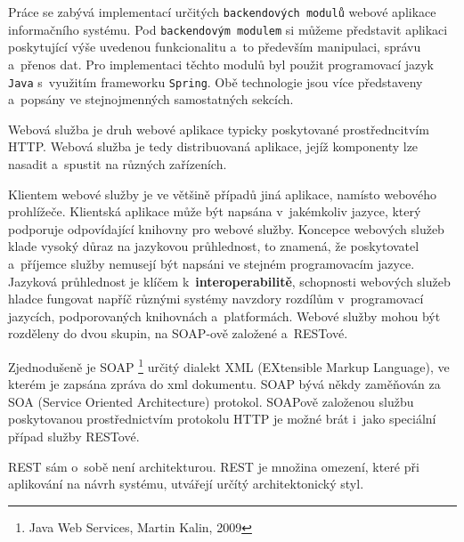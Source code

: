 \documentclass[12pt]{article}
\begin{document}
Práce se zabývá implementací určitých \texttt{backendových modulů} webové aplikace informačního systému. Pod \texttt{backendovým modulem} si můžeme představit aplikaci
poskytující výše uvedenou funkcionalitu a~to především manipulaci, správu a~přenos dat.
Pro implementaci těchto modulů byl použit programovací jazyk \texttt{Java} s~využitím frameworku \texttt{Spring}. Obě technologie jsou více představeny a~popsány ve stejnojmenných samostatných sekcích.




Webová služba
je druh webové aplikace typicky poskytované prostředncitvím HTTP. 
Webová služba je tedy distribuovaná aplikace, jejíž komponenty lze nasadit a~spustit na různých zařízeních. 

Klientem webové služby je ve většině případů jiná aplikace, namísto webového prohlížeče.
Klientská aplikace může být napsána v~jakémkoliv jazyce, který podporuje
odpovídající knihovny pro webové služby.
Koncepce webových služeb klade vysoký důraz na jazykovou průhlednost, 
to znamená, že poskytovatel a~příjemce služby nemusejí být napsáni
ve stejném programovacím jazyce. 
Jazyková průhlednost je klíčem k~\textbf{interoperabilitě}, schopnosti webových služeb hladce fungovat napříč různými systémy navzdory rozdílům v~programovací jazycích,
podporovaných knihovnách a~platformách.
Webové služby mohou být rozděleny do dvou skupin, na SOAP-ově založené a~RESTové.


Zjednodušeně je SOAP \footnote{Java Web Services, Martin Kalin, 2009}  určitý dialekt XML
(EXtensible Markup Language), ve kterém je zapsána zpráva do xml dokumentu.
SOAP bývá někdy zaměňován za SOA (Service Oriented Architecture) protokol.
SOAPově založenou službu poskytovanou prostřednictvím protokolu HTTP je možné brát i~jako speciální případ služby RESTové.




REST sám o~sobě není architekturou. REST je množina omezení,
které při aplikování na návrh systému, utvářejí určítý architektonický styl. 

\bigskip
\end{document}
